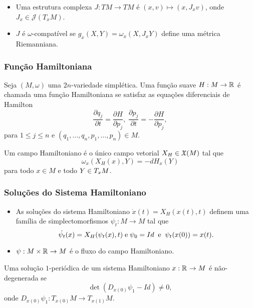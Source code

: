 \documentclass{beamer}
\begin{document}
\begin{footnotesize}
\begin{frame}
\begin{itemize}
			\item Uma estrutura complexa $J:TM\to TM$ é $(x,v)\mapsto (x,J_{x}v)$, onde $J_{x}\in \mathcal{J}(T_{x}M)$.
			
			\item $J$ é $\omega$-compatível se $g_{x}(X,Y) = \omega_{x}(X, J_{x}Y)$ define uma métrica Riemanniana.
		\end{itemize}
		
	\end{frame}
	
	\begin{frame}
		\frametitle{Função Hamiltoniana}
		\begin{definicao}
			Seja $(M, \omega)$ uma $2n$-variedade simplética. Uma função suave $H : M \to \mathbb{R}^{}$ é chamada uma função Hamiltoniana se satisfaz as equações diferenciais de Hamilton
			$$
			\frac{\partial q_{j}}{\partial t} = \frac{\partial H}{\partial p_{j}}, \; \frac{\partial p_{j}}{\partial t} = -\frac{\partial H}{\partial p_{j}},
			$$
			para $1\leq j \leq n$ e $(q_{1}, \dots, q_{n}, p_{1}, \dots, p_{n}) \in M$.
		\end{definicao}
		
		\begin{definicao}
			Um campo Hamiltoniano é o único campo vetorial $X_{H}\in \mathfrak{X}(M)$ tal que
			$$
			\omega_{x}(X_{H}(x), Y) = -dH_{x}(Y)
			$$
			para todo $x\in M$ e todo $Y \in T_{x}M$.
		\end{definicao}
		
		
	\end{frame}

	\begin{frame}
		\frametitle{Soluções do Sistema Hamiltoniano}
		
		\begin{itemize}
			\item As soluções do sistema Hamiltoniano $\dot{x}(t)=X_{H}(x(t), t)$ definem uma família de simplectomorfismos $\psi_{t}:M\to M$ tal que
			$$
			\dot{\psi_{t}}(x) = X_{H}(\psi_{t}(x), t)\; \text{e} \; \psi_{0}=Id\;\;\text{e}\;\; \psi_{t}(x(0)) = x(t).
			$$
			
			\item $\psi :M\times \mathbb{R}^{} \to M$ é o fluxo do campo Hamiltoniano.
		\end{itemize}
		
		\begin{definicao}
			Uma solução $1$-periódica de um sistema Hamiltoniano $x: \mathbb{R}^{}\to M$ é não-degenerada se 
			$$
			\det(D_{x(0)}\psi_{1} - Id)\neq 0,
			$$
			onde $D_{x(0)}\psi_{1}:T_{x(0)}M \to T_{x(1)}M$.
		\end{definicao}
		

\end{frame}
\end{footnotesize}
\end{document}
